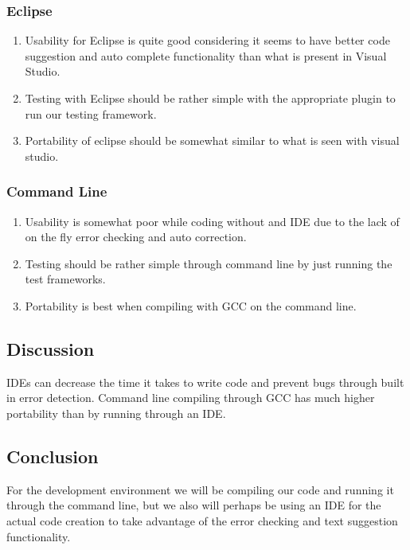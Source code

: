 \documentclass[onecolumn, draftclsnofoot,10pt, compsoc]{IEEEtran}
\begin{document}
\subsubsection{Eclipse}
\begin{enumerate}
\item Usability for Eclipse is quite good considering it seems to have better code suggestion and auto complete functionality than what is present in Visual Studio.
\item Testing with Eclipse should be rather simple with the appropriate plugin to run our testing framework.
\item Portability of eclipse should be somewhat similar to what is seen with visual studio.
\end{enumerate}

\subsubsection{Command Line}
\begin{enumerate}
\item Usability is somewhat poor while coding without and IDE due to the lack of on the fly error checking and auto correction.
\item Testing should be rather simple through command line by just running the test frameworks.
\item Portability is best when compiling with GCC on the command line.
\end{enumerate}

\subsection{Discussion}
IDEs can decrease the time it takes to write code and prevent bugs through built in error detection. Command line compiling through GCC has much higher portability than by running through an IDE.
\subsection{Conclusion}
For the development environment we will be compiling our code and running it through the command line, but we also will perhaps be using an IDE for the actual code creation to take advantage of the error checking and text suggestion functionality.
\end{document}

